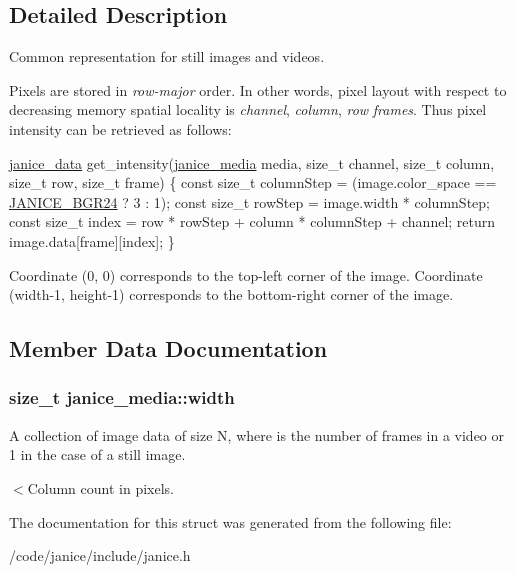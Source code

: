 \subsection{Detailed Description}
Common representation for still images and videos. 

Pixels are stored in {\itshape row-\/major} order. In other words, pixel layout with respect to decreasing memory spatial locality is {\itshape channel}, {\itshape column}, {\itshape row} {\itshape frames}. Thus pixel intensity can be retrieved as follows\+:


\begin{DoxyCode}
\hyperlink{group__janice_ga63103e7e1c9df7d7403640223f3f6f07}{janice\_data} get\_intensity(\hyperlink{structjanice__media}{janice\_media} media, \textcolor{keywordtype}{size\_t} channel, \textcolor{keywordtype}{size\_t} column,
                                              \textcolor{keywordtype}{size\_t} row, \textcolor{keywordtype}{size\_t} frame)
\{
    \textcolor{keyword}{const} \textcolor{keywordtype}{size\_t} columnStep = (image.color\_space == \hyperlink{group__janice_gga4040c8aa81857fc2102f27cf34cd973ea45503c486c3f4d472d838e5d8ba9e4f4}{JANICE\_BGR24} ? 3 : 1);
    \textcolor{keyword}{const} \textcolor{keywordtype}{size\_t} rowStep    = image.width * columnStep;
    \textcolor{keyword}{const} \textcolor{keywordtype}{size\_t} index      = row * rowStep + column * columnStep + channel;
    \textcolor{keywordflow}{return} image.data[frame][index];
\}
\end{DoxyCode}


Coordinate (0, 0) corresponds to the top-\/left corner of the image. Coordinate (width-\/1, height-\/1) corresponds to the bottom-\/right corner of the image. 

\subsection{Member Data Documentation}
\hypertarget{structjanice__media_a26211ab10bfc184f0e30f8bf19031390}{}
\subsubsection[{width}]{\setlength{\rightskip}{0pt plus 5cm}size\+\_\+t janice\+\_\+media\+::width}\label{structjanice__media_a26211ab10bfc184f0e30f8bf19031390}


A collection of image data of size N, where is the number of frames in a video or 1 in the case of a still image. 

$<$Column count in pixels. 

The documentation for this struct was generated from the following file\+:\begin{DoxyCompactItemize}
\item 
/code/janice/include/janice.\+h\end{DoxyCompactItemize}

